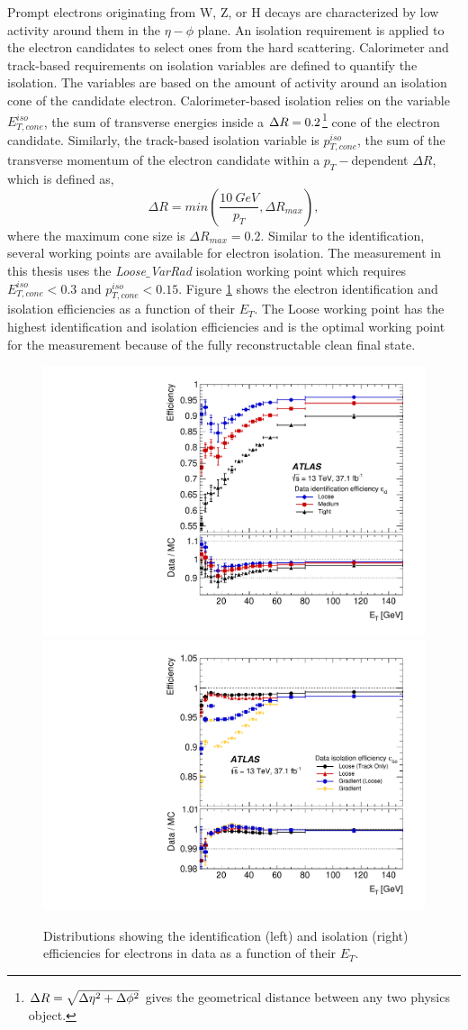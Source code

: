 Prompt electrons originating from W, Z, or H decays are characterized by low activity around them in the $\eta-\phi$ plane. An isolation requirement is applied to the electron candidates to select ones from the hard scattering. Calorimeter and track-based requirements on isolation variables are defined to quantify the isolation. The variables are based on the amount of activity around an isolation cone of the candidate electron. Calorimeter-based isolation relies on the variable $E_{T,cone}^{iso}$, the sum of transverse energies inside a $\Delta R=0.2$\footnote{$\Delta R=\sqrt{\Delta\eta^2+\Delta\phi^2}$ gives the geometrical distance between any two physics object.} cone of the electron candidate. Similarly, the track-based isolation variable is $p_{T,cone}^{iso}$, the sum of the transverse momentum of the electron candidate within a $p_{T}-$dependent $\Delta R$, which is defined as, 
\begin{equation}
\Delta R = min \left( \frac{10 ~ GeV}{p_{T}},\Delta R_{max} \right),
\end{equation}
where the maximum cone size is $\Delta R_{max} = 0.2$. Similar to the identification, several working points are available for electron isolation. The measurement in this thesis uses the \textit{Loose$\_$VarRad} isolation working point which requires $E_{T,cone}^{iso} < 0.3$ and $p_{T,cone}^{iso} < 0.15$. Figure \ref{fig:ElecEff} shows the electron identification and isolation efficiencies as a function of their $E_{T}$. The Loose working point has the highest identification and isolation efficiencies and is the optimal working point for the measurement because of the fully reconstructable clean final state.

\begin{figure}[!htb]
    \centering
    \includegraphics[width=.49\linewidth]{figures/LHC/ElecIdent_Eff.pdf}
    \includegraphics[width=.49\linewidth]{figures/LHC/Elec_IsoEff.pdf}
    \caption{ Distributions showing the identification (left) and isolation (right) efficiencies for electrons in data as a function of their $E_{T}$\cite{ElectronReco}.\label{fig:ElecEff}}
\end{figure}

